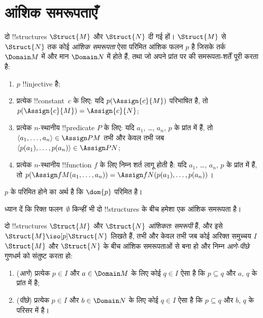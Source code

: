 \documentclass[../../../include/open-logic-section]{subfiles}
\begin{document}
\section{आंशिक समरूपताएँ}

\begin{defn}
  दो !!{structure}s $\Struct{M}$ और $\Struct{N}$ दी गई हों। $\Struct{M}$
  से $\Struct{N}$ तक कोई \emph{आंशिक समरूपता} ऐसा परिमित आंशिक फलन $p$ है
  जिसके तर्क $\Domain M$ में और मान $\Domain N$ में होते हैं, तथा जो अपने
  प्रांत पर  की समरूपता-शर्तें पूरी करता है:
  \begin{enumerate}
  \item $p$ !!{injective} है;
  \item प्रत्येक !!{constant}~$c$ के लिए: यदि $p(\Assign{c}{M})$ परिभाषित
    है, तो $p(\Assign{c}{M}) = \Assign{c}{N}$;
  \item प्रत्येक $n$-स्थानीय !!{predicate} $P$ के लिए: यदि $a_1$, \dots,
    $a_n$, $p$ के प्रांत में हैं, तो $\langle a_1, \dots, a_n\rangle \in
    \Assign P M$ तभी और केवल तभी जब $\langle p(a_1), \dots, p(a_n) \rangle
    \in \Assign P N$;
  \item प्रत्येक $n$-स्थानीय !!{function} $f$ के लिए निम्न शर्त लागू होती
    है: यदि $a_1$, \dots, $a_n$, $p$ के प्रांत में हैं, तो
    $p(\Assign f M (a_1, \dots,a_n))
    = \Assign f N (p(a_1), \dots, p(a_n))$।
  \end{enumerate}
  $p$ के परिमित होने का अर्थ है कि $\dom{p}$ परिमित है।
\end{defn}

ध्यान दें कि रिक्त फलन~$\emptyset$ किन्हीं भी दो !!{structure}s के बीच
हमेशा एक आंशिक समरूपता है।

\begin{defn}
  दो !!{structure}s $\Struct{M}$ और $\Struct{N}$ \emph{आंशिकतः समरूपी}
  हैं, और इसे $\Struct{M} \iso[p]
  \Struct{N}$ लिखते हैं, तभी और केवल तभी जब कोई अरिक्त समुच्चय $I$
  $\Struct{M}$ और $\Struct{N}$ के बीच आंशिक समरूपताओं से बना हो और निम्न
  \emph{आगे-पीछे} गुणधर्म को संतुष्ट करता हो:
  \begin{enumerate}
  \item (\emph{आगे}) प्रत्येक $p \in I$ और $a \in \Domain M$ के लिए कोई
    $q \in I$ ऐसा है कि $p \subseteq q$ और $a$, $q$ के प्रांत में है;
  \item (\emph{पीछे}) प्रत्येक $p \in I$ और $b \in \Domain N$ के लिए कोई
    $q \in I$ ऐसा है कि $p \subseteq q$ और $b$, $q$ के परिसर में है।
  \end{enumerate}
\end{defn}
\end{document}

